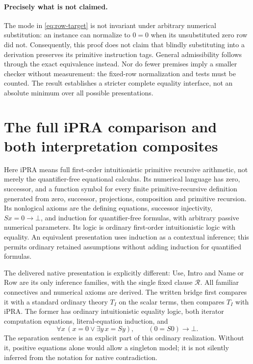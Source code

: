 \documentclass[11pt,letterpaper]{article}
\theoremstyle{definition}\newtheorem{definition}[theorem]{Definition}
\theoremstyle{remark}\newtheorem{remark}[theorem]{Remark}
\begin{document}
\paragraph{Precisely what is not claimed.}
The mode in \eqref{eq:row-target} is not invariant under arbitrary
numerical substitution: an instance can normalize to $0=0$ when its
unsubstituted zero row did not.  Consequently, this proof does not claim
that blindly substituting into a derivation preserves its primitive
instruction tags.  General admissibility follows through the exact
equivalence instead.  Nor do fewer premises imply a smaller checker
without measurement: the fixed-row normalization and tests must be
counted.  The result establishes a stricter complete equality interface,
not an absolute minimum over all possible presentations.


\section{The full iPRA comparison and both interpretation composites}
\label{sec:full-bridge}

Here iPRA means full first-order intuitionistic primitive recursive
arithmetic, not merely the quantifier-free equational calculus. Its numerical
language has zero, successor, and a function symbol for every finite
primitive-recursive definition generated from zero, successor, projections,
composition and primitive recursion. Its nonlogical axioms are the defining
equations, successor injectivity, $Sx=0\to\bot$, and induction for
quantifier-free formulas, with arbitrary passive numerical parameters.
Its logic is ordinary first-order intuitionistic logic with equality.
An equivalent presentation uses induction as a contextual inference; this
permits ordinary retained assumptions without adding induction for quantified
formulas.

The delivered native presentation is explicitly different: Use, Intro and
Name or Row are its only inference families, with the single fixed clause
$\mathcal R$. All familiar connectives and numerical axioms are derived.
The written bridge first compares it with a standard ordinary theory $T_I$
on the scalar terms, then compares $T_I$ with iPRA. The former has ordinary
intuitionistic equality logic, both iterator computation equations,
literal-equation induction, and
\[
 \forall x\,(x=0\vee\exists y\,x=Sy),\qquad (0=S0)\to\bot.
\]
The separation sentence is an explicit part of this ordinary realization.
Without it, positive equations alone would allow a singleton model; it is
not silently inferred from the notation for native contradiction.
\end{document}
